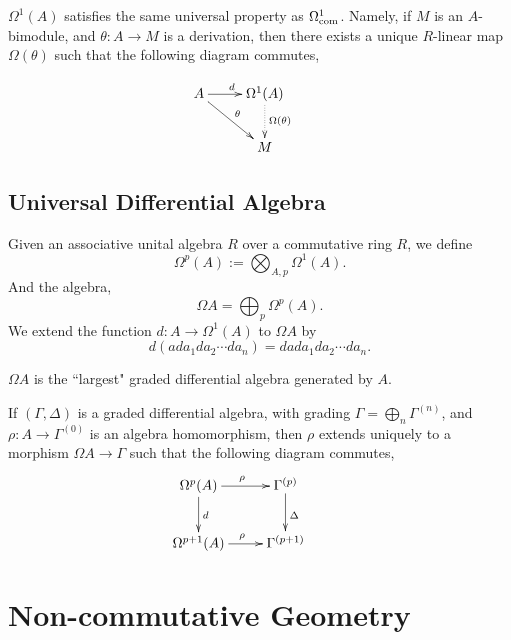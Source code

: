 \documentclass{owmaths}
\begin{document}
$\Omega^1(A)$ satisfies the 
same universal property as $\Omega^1_{\mathrm{com}}$. Namely, if $M$ is an $A$-bimodule,
and $\theta:A\rightarrow M$ is a derivation, then there exists a unique $R$-linear
map $\Omega(\theta)$ such that the following diagram commutes,

    \begin{displaymath}
    \xymatrix{
        A \ar[r]^d \ar[rd]^\theta & 
        \Omega^1(A) \ar@{.>}[d]^{\Omega(\theta)} &\\
         &
        M
  } 
  \end{displaymath}
  
\subsection{Universal Differential Algebra}
Given an associative unital algebra $R$ over a commutative ring $R$,
we define
\begin{equation*}
    \Omega^p(A) := \bigotimes_{A,p} \Omega^1(A).
\end{equation*} 
And the algebra,
\begin{equation*}
    \Omega A = \bigoplus_{p} \Omega^p(A).
\end{equation*}
We extend the function $d:A\rightarrow \Omega^1(A)$ to $\Omega A$
by
\begin{equation*}
    d(ada_1da_2\cdots da_n) = dada_1da_2\cdots da_n.
\end{equation*}
 
\begin{theorem}
    $\Omega A$ is the ``largest" graded differential algebra generated by $A$. 
    
    If $(\Gamma,\Delta)$ is a graded differential algebra, with grading $\Gamma = \bigoplus_n \Gamma^{(n)}$,
    and $\rho:A\rightarrow \Gamma^{(0)}$ is an algebra homomorphism, then $\rho$
    extends uniquely to a morphism $\Omega A\rightarrow \Gamma$ such that the following
    diagram commutes,
    \begin{displaymath}
    \xymatrix{
        \Omega^p(A) \ar[r]^\rho \ar[d]^{d} & 
        \Gamma^{(p)} \ar[d]^\Delta&\\
        \Omega^{p+1}(A) \ar[r]^\rho & 
        \Gamma^{(p+1)}&
    }
    \end{displaymath}
\end{theorem}

\section*{Non-commutative Geometry}
\end{document}
